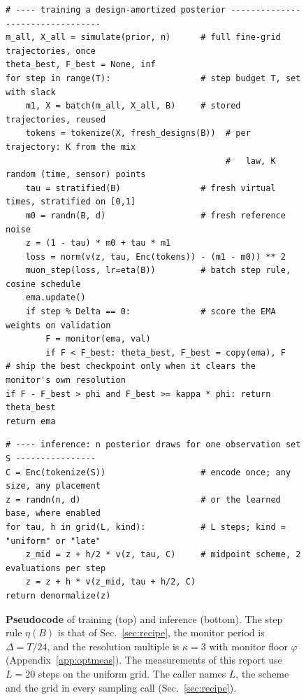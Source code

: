 \documentclass[10pt]{article}
\begin{document}
\begin{figure}[t]
\begin{lstlisting}[style=he]
# ---- training a design-amortized posterior ---------------------------------
m_all, X_all = simulate(prior, n)      # full fine-grid trajectories, once
theta_best, F_best = None, inf
for step in range(T):                  # step budget T, set with slack
    m1, X = batch(m_all, X_all, B)     # stored trajectories, reused
    tokens = tokenize(X, fresh_designs(B))  # per trajectory: K from the mix
                                            #   law, K random (time, sensor) points
    tau = stratified(B)                # fresh virtual times, stratified on [0,1]
    m0 = randn(B, d)                   # fresh reference noise
    z = (1 - tau) * m0 + tau * m1
    loss = norm(v(z, tau, Enc(tokens)) - (m1 - m0)) ** 2
    muon_step(loss, lr=eta(B))         # batch step rule, cosine schedule
    ema.update()
    if step % Delta == 0:              # score the EMA weights on validation
        F = monitor(ema, val)
        if F < F_best: theta_best, F_best = copy(ema), F
# ship the best checkpoint only when it clears the monitor's own resolution
if F - F_best > phi and F_best >= kappa * phi: return theta_best
return ema
\end{lstlisting}
\vspace{1.5mm}
\begin{lstlisting}[style=he]
# ---- inference: n posterior draws for one observation set S ----------------
C = Enc(tokenize(S))                   # encode once; any size, any placement
z = randn(n, d)                        # or the learned base, where enabled
for tau, h in grid(L, kind):           # L steps; kind = "uniform" or "late"
    z_mid = z + h/2 * v(z, tau, C)     # midpoint scheme, 2 evaluations per step
    z = z + h * v(z_mid, tau + h/2, C)
return denormalize(z)
\end{lstlisting}
\caption{\textbf{Pseudocode} of training (top) and inference (bottom). The step rule $\eta(B)$ is that
of Sec.~\ref{sec:recipe}, the monitor period is $\Delta = T/24$, and the resolution multiple is
$\kappa = 3$ with monitor floor $\varphi$ (Appendix~\ref{app:optmeas}). The measurements of this
report use $L = 20$ steps on the uniform grid. The caller names $L$, the scheme and the grid in every
sampling call (Sec.~\ref{sec:recipe}).}
\label{fig:pseudocode}
\end{figure}
\end{document}
